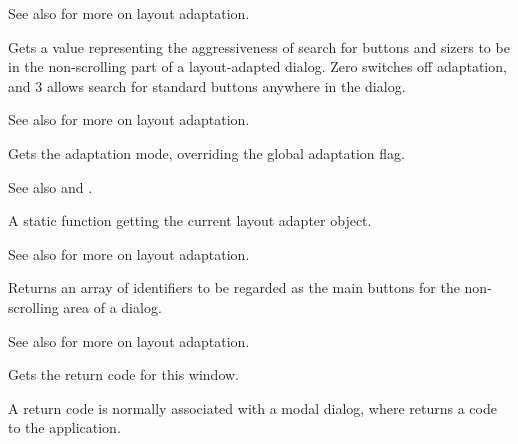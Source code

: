 See also  for more on layout adaptation.


\label{wxdialoggetlayoutadaptationlevel}


Gets a value representing the aggressiveness of search for buttons and sizers to be in the non-scrolling part of a layout-adapted dialog.
Zero switches off adaptation, and 3 allows search for standard buttons anywhere in the dialog.

See also  for more on layout adaptation.


\label{wxdialoggetlayoutadaptationmode}


Gets the adaptation mode, overriding the global adaptation flag.

See also  and .

\label{wxdialoggetlayoutadapter}


A static function getting the current layout adapter object.

See also  for more on layout adaptation.


\label{wxdialoggetmainbuttonids}


Returns an array of identifiers to be regarded as the main buttons for the non-scrolling area of a dialog.

See also  for more on layout adaptation.

\label{wxdialoggetreturncode}


Gets the return code for this window.


A return code is normally associated with a modal dialog, where  returns
a code to the application.

